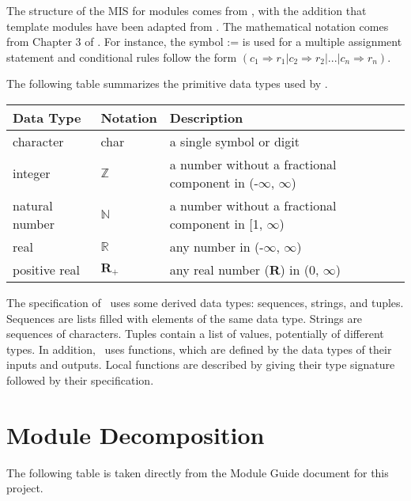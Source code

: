\documentclass[12pt, titlepage]{article}
\begin{document}

The structure of the MIS for modules comes from \citet{HoffmanAndStrooper1995},
with the addition that template modules have been adapted from
\cite{GhezziEtAl2003}.  The mathematical notation comes from Chapter 3 of
\citet{HoffmanAndStrooper1995}.  For instance, the symbol := is used for a
multiple assignment statement and conditional rules follow the form $(c_1
\Rightarrow r_1 | c_2 \Rightarrow r_2 | ... | c_n \Rightarrow r_n )$.

The following table summarizes the primitive data types used by \progname. 

\begin{center}
\renewcommand{\arraystretch}{1.2}
\noindent 
\begin{tabular}{l l p{7.5cm}} 
\toprule 
\textbf{Data Type} & \textbf{Notation} & \textbf{Description}\\ 
\midrule
character & char & a single symbol or digit\\
integer & $\mathbb{Z}$ & a number without a fractional component in (-$\infty$, $\infty$) \\
natural number & $\mathbb{N}$ & a number without a fractional component in [1, $\infty$) \\
real & $\mathbb{R}$ & any number in (-$\infty$, $\infty$)\\
positive real & $\mathbf{R}_{+}$ & any real number ($\mathbf{R}$) in ($0$, $\infty$) \\
\bottomrule
\end{tabular} 
\end{center}

\noindent
The specification of \progname \ uses some derived data types: sequences, strings, and
tuples. Sequences are lists filled with elements of the same data type. Strings
are sequences of characters. Tuples contain a list of values, potentially of
different types. In addition, \progname \ uses functions, which
are defined by the data types of their inputs and outputs. Local functions are
described by giving their type signature followed by their specification.

\section{Module Decomposition}

The following table is taken directly from the Module Guide document for this project.
\end{document}
